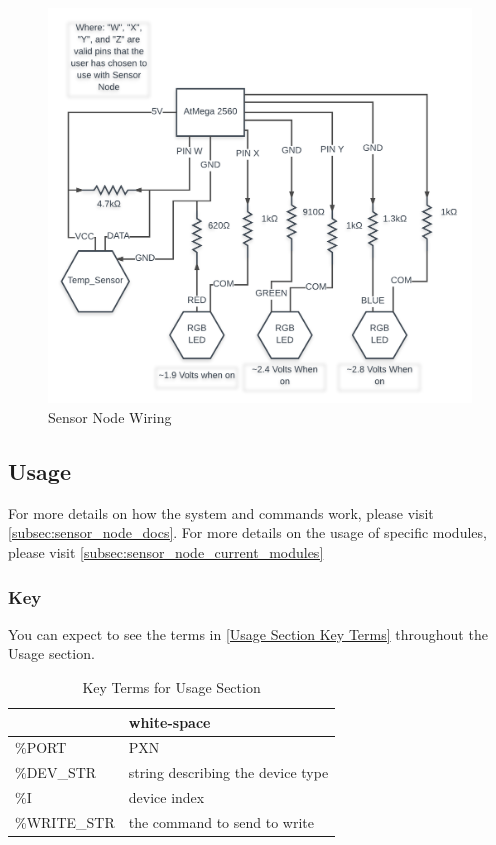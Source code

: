 \documentclass{article}
\begin{document}
\begin{figure}[h!]
    \centering
        \includegraphics[width=\linewidth]{Sensor_Node_System_Physical_Wiring.png}
        \caption{Sensor Node Wiring}
        \label{Sensor Node Wiring}
\end{figure}

\subsection{Usage}
\label{subsec:sensor_node_usage}

For more details on how the system and commands work, please visit \autoref{subsec:sensor_node_docs}. For more details on the usage of specific modules, please visit \autoref{subsec:sensor_node_current_modules}

\subsubsection{Key}

You can expect to see the terms in \autoref{Usage Section Key Terms} throughout the Usage section.
\\

\begin{table}[h!]
    \centering
  \begin{tabular}{ | l | l | }
    \hline
    [ ] & white-space \\ \hline
    \%PORT & PXN \\ \hline
    \%DEV\_STR & string describing the device type \\ \hline
    \%I & device index \\ \hline
    \%WRITE\_STR & the command to send to write \\
    \hline
    \end{tabular}
    \caption{Key Terms for Usage Section}
    \label{Usage Section Key Terms}
\end{table}
\end{document}
